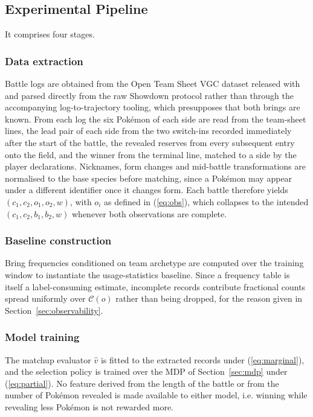 \documentclass[conference]{IEEEtran}
\begin{document}
\subsection{Experimental Pipeline}

It comprises four stages.

\subsubsection{Data extraction} Battle logs are obtained from the Open Team Sheet
VGC dataset released with \cite{angliss2026} and parsed directly from the raw
Showdown protocol rather than through the accompanying log-to-trajectory
tooling, which presupposes that both brings are known. From each log the six
Pok\'emon of each side are read from the team-sheet lines, the lead pair of
each side from the two switch-ins recorded immediately after the start of the
battle, the revealed reserves from every subsequent entry onto the field, and
the winner from the terminal line, matched to a side by the player
declarations. Nicknames, form changes and mid-battle transformations are
normalised to the base species before matching, since a Pok\'emon may appear
under a different identifier once it changes form. Each battle therefore yields
$(c_1, c_2, o_1, o_2, w)$, with $o_i$ as defined in (\ref{eq:obs}), which
collapses to the intended $(c_1, c_2, b_1, b_2, w)$ whenever both observations
are complete.

\subsubsection{Baseline construction} Bring frequencies conditioned on team archetype
are computed over the training window to instantiate the usage-statistics
baseline. Since a frequency table is itself a label-consuming estimate, incomplete
records contribute fractional counts spread uniformly over $\mathcal{C}(o)$
rather than being dropped, for the reason given in Section~\ref{sec:observability}.

\subsubsection{Model training} The matchup evaluator $\hat{v}$ is fitted to the
extracted records under (\ref{eq:marginal}), and the selection policy is
trained over the MDP of Section~\ref{sec:mdp} under (\ref{eq:partial}). No
feature derived from the length of the battle or from the number of Pok\'emon
revealed is made available to either model, i.e. winning while revealing less Pokémon is not rewarded more.
\end{document}
